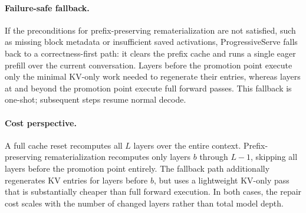 \paragraph{Failure-safe fallback.}
If the preconditions for prefix-preserving rematerialization are not satisfied, such as missing block metadata or insufficient saved activations, ProgressiveServe falls back to a correctness-first path: it clears the prefix cache and runs a single eager prefill over the current conversation. Layers before the promotion point execute only the minimal KV-only work needed to regenerate their entries, whereas layers at and beyond the promotion point execute full forward passes. This fallback is one-shot; subsequent steps resume normal decode.

\paragraph{Cost perspective.}
A full cache reset recomputes all $L$ layers over the entire context. Prefix-preserving rematerialization recomputes only layers $b$ through $L{-}1$, skipping all layers before the promotion point entirely. The fallback path additionally regenerates KV entries for layers before $b$, but uses a lightweight KV-only pass that is substantially cheaper than full forward execution. In both cases, the repair cost scales with the number of changed layers rather than total model depth.
